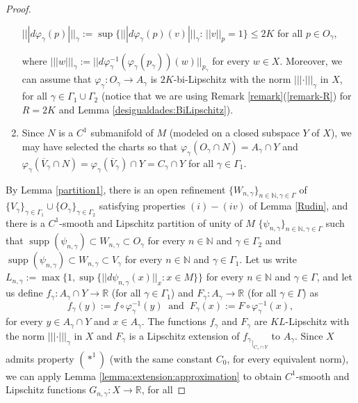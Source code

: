 \documentclass[11pt]{amsart}
\numberwithin{equation}{section}
\begin{document}
\begin{proof}
\begin{enumerate}
\begin{center}
$|||d\varphi_\gamma(p)|||_\gamma:=\sup\{|||d\varphi_\gamma(p)(v)|||_\gamma: \, ||v||_p=1\}\le 2K$ {for all } $p\in O_\gamma,$
\end{center}
where $|||w|||_\gamma:=||d\varphi^{-1}_{\gamma}(\varphi_{\gamma}(p_\gamma))(w)||_{p_\gamma}$ for every $w\in X$. Moreover, we can assume that $\varphi_\gamma:O_\gamma\rightarrow A_\gamma$ is $2K$-bi-Lipschitz with the norm $|||\cdot|||_{\gamma}$ in $X$, for all $\gamma \in \Gamma_1 \cup \Gamma_2$ (notice that we are using Remark \ref{remark}(\ref{remark-R}) for $R=2K$ and Lemma \ref{desigualdades:BiLipschitz}).
\item Since  $N$ is a  $C^1$ submanifold of $M$  (modeled on a closed subspace $Y$ of $X$), we may have selected the charts so that
 $\varphi_\gamma(O_\gamma\cap N)=A_\gamma\cap Y$ and $\varphi_\gamma(\overline{V}_\gamma\cap N)=\varphi_\gamma(\overline{V}_\gamma) \cap Y=C_\gamma \cap Y$ for all $\gamma \in \Gamma_1$.
\end{enumerate}
By Lemma \ref{partition1}, there is an open refinement $\{W_{n,\gamma}\}_{n\in \mathbb N,\gamma \in \Gamma}$ of $\{V_\gamma \}_{\gamma\in \Gamma_1}\cup \{O_\gamma\}_{\gamma \in \Gamma_2}$ satisfying  properties $(i)-(iv)$ of Lemma \ref{Rudin}, and there is
a $C^1$-smooth and Lipschitz partition of unity of $M$
$\{\psi_{n,\gamma}\}_{n\in \mathbb N,\gamma\in \Gamma}$   such that   ${\operatorname{supp}}(\psi_{n,\gamma})\subset W_{n,\gamma}\subset O_\gamma$ for every $n\in\mathbb{N}$ and $\gamma\in \Gamma_2$ and  ${\operatorname{supp}}(\psi_{n,\gamma})\subset W_{n,\gamma}\subset V_\gamma$  for every $n\in\mathbb{N}$ and $\gamma\in \Gamma_1$. Let us write $L_{n,\gamma}:=
\max\{1, \sup\{||d\psi_{n,\gamma}(x)||_x:x\in M\}\}$ for every $n\in\mathbb{N}$ and $\gamma\in \Gamma$, and let us define
 $f_\gamma:A_\gamma\cap Y\to {\mathbb{R}}$ (for all $\gamma\in \Gamma_1$) and $F_\gamma:A_\gamma\to{\mathbb{R}}$
 (for all $\gamma\in \Gamma$) as
\begin{equation*}
f_\gamma(y):=f\circ \varphi^{-1}_\gamma(y)\ \text{ and }\ F_\gamma(x):=F\circ \varphi^{-1}_\gamma(x),
\end{equation*}
for every $y\in A_\gamma\cap Y$ and $x\in A_\gamma$.
The functions $f_\gamma$ and $F_\gamma$ are $KL$-Lipschitz with the norm
$|||\cdot|||_\gamma$ in $X$  and $F_\gamma$ is a Lipschitz extension of ${f_{\gamma}}_{\mid_{C_\gamma\cap Y}}$
to $A_\gamma$.
Since $X$ admits property $(*^1)$ (with the same constant $C_0$, for every equivalent norm), we can apply Lemma \ref{lemma:extension:approximation} to obtain  $C^1$-smooth and Lipschitz functions $G_{n,\gamma}:X\to{\mathbb{R}}$, for all

\end{proof}
\end{document}
